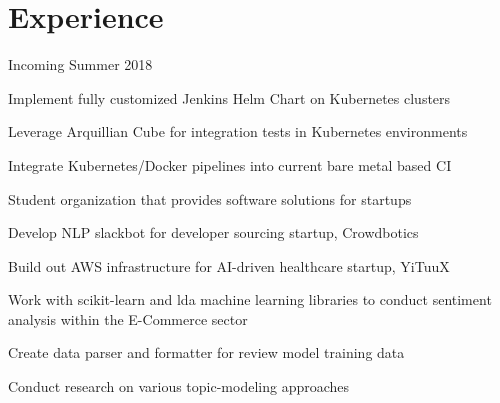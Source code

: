 \documentclass[]{deedy-resume}
\begin{document}
\hfill
\begin{minipage}[t]{0.66\textwidth}


\section{Experience}

\vspace{\topsep}
\begin{tightemize}
  \item Incoming Summer 2018
\end{tightemize}

\sectionsep{}
\begin{tightemize}
  \item Implement fully customized Jenkins Helm Chart on Kubernetes clusters
  \item Leverage Arquillian Cube for integration tests in Kubernetes environments
  \item Integrate Kubernetes/Docker pipelines into current bare metal based CI
\end{tightemize}
\sectionsep{}

\begin{tightemize}
    \item Student organization that provides software solutions for startups
    \item Develop NLP slackbot for developer sourcing startup, Crowdbotics
    \item Build out AWS infrastructure for AI-driven healthcare startup, YiTuuX
\end{tightemize}
\sectionsep{}

\begin{tightemize}
  \item Work with scikit-learn and lda machine learning libraries to conduct sentiment analysis within the E-Commerce sector
  \item Create data parser and formatter for review model training data
  \item Conduct research on various topic-modeling approaches
\end{tightemize}
\sectionsep{}


\end{minipage}
\end{document}

